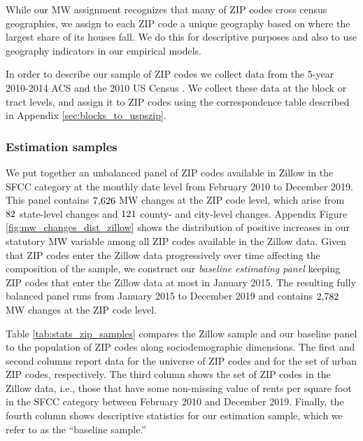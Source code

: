 While our MW assignment recognizes that many of ZIP codes cross census 
geographies, we assign to each ZIP code a unique geography based on where the 
largest share of its houses fall.
We do this for descriptive purposes and also to use geography indicators 
in our empirical models.

In order to describe our sample of ZIP codes we collect data from 
the 5-year 2010-2014 ACS \parencite{CensusACS} and
the 2010 US Census \parencite{CensusDecennial}.
We collect these data at the block or tract levels, and assign it to ZIP codes
using the correspondence table described in Appendix \ref{sec:blocks_to_uspszip}.

\subsubsection{Estimation samples}\label{sec:data_final_panel}

We put together an unbalanced panel of ZIP codes available in Zillow in the SFCC 
category at the monthly date level from February 2010 to December 2019.
This panel contains $\textnormal{7,626}$ MW changes at the ZIP code level, 
which arise from $\textnormal{82}$ state-level changes and 
$\textnormal{121}$ county- and city-level changes.
Appendix Figure \ref{fig:mw_changes_dist_zillow} shows the distribution of 
positive increases in our statutory MW variable among all ZIP codes available 
in the Zillow data.
Given that ZIP codes enter the Zillow data progressively over time affecting 
the composition of the sample,
we construct our \textit{baseline estimating panel} keeping ZIP codes that enter 
the Zillow data at most in January 2015.
The resulting fully balanced panel runs from January 2015 to December 2019
and contains $\textnormal{2,782}$ MW changes at the ZIP code level.

Table \ref{tab:stats_zip_samples} compares the Zillow sample and our baseline 
panel to the population of ZIP codes along sociodemographic dimensions. 
The first and second columns report data for the universe of ZIP codes and 
for the set of urban ZIP codes, respectively.
The third column shows the set of ZIP codes in the Zillow data, i.e., those 
that have some non-missing value of rents per square foot in the SFCC category 
between February 2010 and December 2019.
Finally, the fourth column shows descriptive statistics for our estimation 
sample, which we refer to as the ``baseline sample.''

